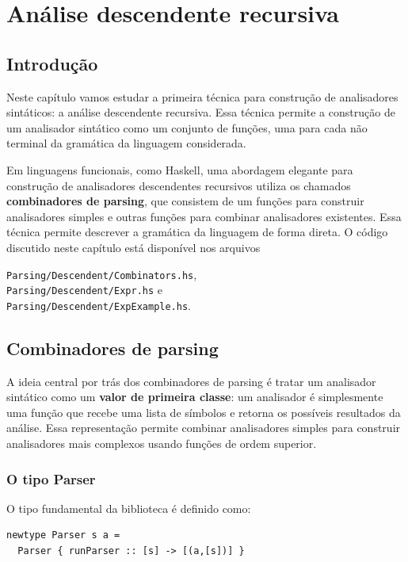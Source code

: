 \chapter{Análise descendente recursiva}

\section{Introdução}

Neste capítulo vamos estudar a primeira técnica para construção de
analisadores sintáticos: a análise descendente recursiva. Essa
técnica permite a construção de um analisador sintático como um
conjunto de funções, uma para cada não terminal da gramática da
linguagem considerada.

Em linguagens funcionais, como Haskell, uma abordagem elegante para
construção de analisadores descendentes recursivos utiliza os
chamados \textbf{combinadores de parsing}, que consistem de um
funções para construir analisadores simples e outras funções para
combinar analisadores existentes. Essa técnica permite descrever a
gramática da linguagem de forma direta. O código discutido neste
capítulo está disponível nos arquivos
\begin{flushleft}
  \verb|Parsing/Descendent/Combinators.hs|,\\
  \verb|Parsing/Descendent/Expr.hs| e\\
  \verb|Parsing/Descendent/ExpExample.hs|.
\end{flushleft}

\section{Combinadores de parsing}

A ideia central por trás dos combinadores de parsing é tratar um
analisador sintático como um \textbf{valor de primeira classe}: um
analisador é simplesmente uma função que recebe uma lista de símbolos
e retorna os possíveis resultados da análise. Essa representação
permite combinar analisadores simples para construir analisadores
mais complexos usando funções de ordem superior.

\subsection{O tipo Parser}

O tipo fundamental da biblioteca é definido como:

\begin{verbatim}
newtype Parser s a =
  Parser { runParser :: [s] -> [(a,[s])] }
\end{verbatim}

